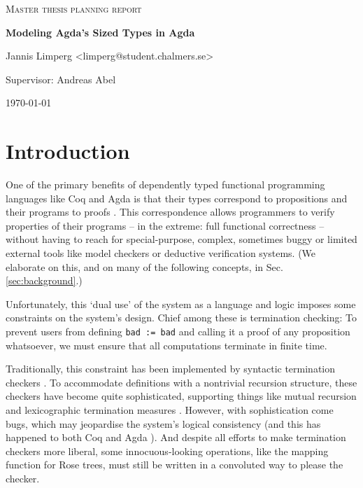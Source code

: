 \documentclass{scrartcl}
\begin{document}
\begin{titlepage}

\centering
  
  
{\scshape\LARGE Master thesis planning report\\}
  
\vspace{0.5cm}
  
{\huge\bfseries Modeling Agda's Sized Types in Agda \\}
  
\vspace{2cm}
  
{\Large Jannis Limperg <limperg@student.chalmers.se>\\}
  
\vspace{1.0cm}
  
{\large Supervisor: Andreas Abel\\}
  
\vfill
  
{\large \today\\} 

\end{titlepage}

\section{Introduction}

One of the primary benefits of dependently typed functional programming
languages like Coq \cite{coq} and Agda \cite{norellphd} is that their types
correspond to propositions and their programs to proofs \cite{curry1958,
  debruijn1970, howard1980}. This correspondence allows programmers to verify
properties of their programs -- in the extreme: full functional correctness --
without having to reach for special-purpose, complex, sometimes buggy or limited
external tools like model checkers or deductive verification systems.
(We elaborate on this, and on many of the following concepts, in Sec.
\ref{sec:background}.)

Unfortunately, this \enquote*{dual use} of the system as a language and logic
imposes some constraints on the system's design. Chief among these is
termination checking: To prevent users from defining \texttt{bad := bad} and
calling it a proof of any proposition whatsoever, we must ensure that all
computations terminate in finite time.

Traditionally, this constraint has been implemented by syntactic termination
checkers \cite{gimenez1995}. To accommodate definitions with a nontrivial
recursion structure, these checkers have become quite sophisticated, supporting
things like mutual recursion and lexicographic termination measures
\cite{abel2002}. However, with sophistication come bugs, which may jeopardise
the system's logical consistency (and this has happened to both Coq and Agda
\cite{coqbug2013, agdabug2013}). And despite all efforts to make termination
checkers more liberal, some innocuous-looking operations, like the mapping
function for Rose trees, must still be written in a convoluted way to please the
checker. 
\end{document}
